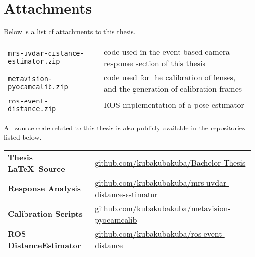 
\appendix
\renewcommand\chaptername{Appendix}

\renewcommand{\thechapter}{A}
\renewcommand\chaptername{Appendix A}

\chapter{Attachments}
\noindent
Below is a list of attachments to this thesis.

\vspace{1em}

\renewcommand{\arraystretch}{2.2} %

\noindent
\begin{tabularx}{\textwidth}{>{\raggedright\arraybackslash}p{7cm} X}
\texttt{mrs-uvdar-distance-estimator.zip} & code used in the event-based camera response section of this thesis \\
\texttt{metavision-pyocamcalib.zip} &  code used for the calibration of lenses, and the generation of calibration frames \\
\texttt{ros-event-distance.zip} &  ROS implementation of a pose estimator \\
\end{tabularx}

\vspace{2em}

\noindent All source code related to this thesis is also publicly available in the repositories listed below.

\vspace{1em}

\renewcommand{\arraystretch}{2.2} %

\noindent
\begin{tabularx}{\textwidth}{>{\raggedright\arraybackslash}p{5cm} X}
\hline
\textbf{Thesis \LaTeX\ Source} & \href{https://github.com/kubakubakuba/Bachelor-Thesis}{github.com/kubakubakuba/Bachelor-Thesis} \\
\textbf{Response Analysis} & \href{https://github.com/kubakubakuba/mrs-uvdar-distance-estimator}{github.com/kubakubakuba/mrs-uvdar-distance-estimator} \\
\textbf{Calibration Scripts} & \href{https://github.com/kubakubakuba/metavision-pyocamcalib}{github.com/kubakubakuba/metavision-pyocamcalib} \\
\textbf{ROS DistanceEstimator} & \href{https://github.com/kubakubakuba/ros-event-distance}{github.com/kubakubakuba/ros-event-distance} \\
\hline
\end{tabularx}

